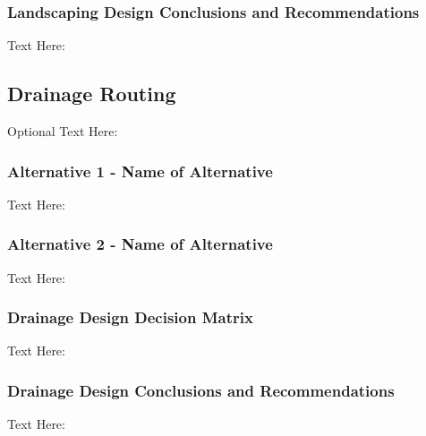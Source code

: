 \documentclass{ceri}
\begin{document}
\subsubsection{Landscaping Design Conclusions and Recommendations}
Text Here:
\subsection{Drainage Routing}
Optional Text Here:

\subsubsection{Alternative 1 - Name of Alternative}
Text Here:


\subsubsection{Alternative 2 - Name of Alternative}
Text Here:

\subsubsection{Drainage Design Decision Matrix}
Text Here:

\begin{table}[H]
\centering
\caption{Drainage Design Decision Matrix}
\label{my-label}
\end{table}

\subsubsection{Drainage Design Conclusions and Recommendations}
Text Here:
\end{document}
